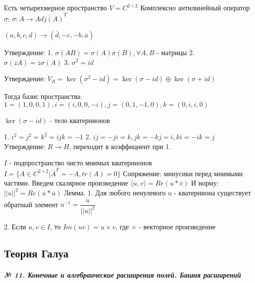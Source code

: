 \documentclass{article}
\begin{document}
\begin{flushleft}

Есть четырехмерное пространство $V = C^{2 \times 2}$
Комплексно антилинейный оператор $\sigma$:
$\sigma: A \rightarrow \overline{Adj(A)}^T$

$(a, b, c, d) \rightarrow (\overline{d}, -\overline{c}, -\overline{b}, \overline{a})$

Утверждение:
1. $\sigma(AB) = \sigma(A) \sigma(B), \forall A, B$ - матрицы
2. $\sigma(zA) = \overline{z} \sigma(A)$
3. $\sigma^2 = id$

Утверждение:
$V_R = \ker{(\sigma^2 - id)} = \ker{(\sigma - id)} \oplus \ker{(\sigma + id)}$

Тогда базис пространства: $1 = (1, 0, 0, 1), i = (i, 0, 0, -i), j = (0, 1, -1, 0), k = (0, i, i, 0)$

$\ker{(\sigma - id)}$ - тело кватернионов

1. $i^2 = j^2 = k^2 = ijk = -1$
2. $ij = -ji = k, jk = -kj = i, ki = -ik = j$
Утверждение:
$R \rightarrow H$, переходит в коэффициент при 1.

$I$ - подпространство чисто мнимых кватернионов
$I = \{A \in C^{2 \times 2} | \overline{A}^T = -A, tr(A) = 0 \}$
Сопряжение: минусики перед мнимыми частями.
Введем скалярное произведение $\langle u, v \rangle = Re(u * \overline{v})$
И норму: $||u||^2 = Re(u * \overline{u})$
Лемма.
1. Для любого ненулевого u - кватерниона существует обратный элемент $u^{-1} = \dfrac{\overline{u}}{||u||^2}$

2. Если $u, v \in I$, то $Im(uv) = u \times v$, где $\times$ - векторное произведение

\end{flushleft}

\subsection{\tiny Теория Галуа}

\subparagraph{\tiny № 11. Конечные и алгебраические расширения полей. Башня расширений}
\end{document}
